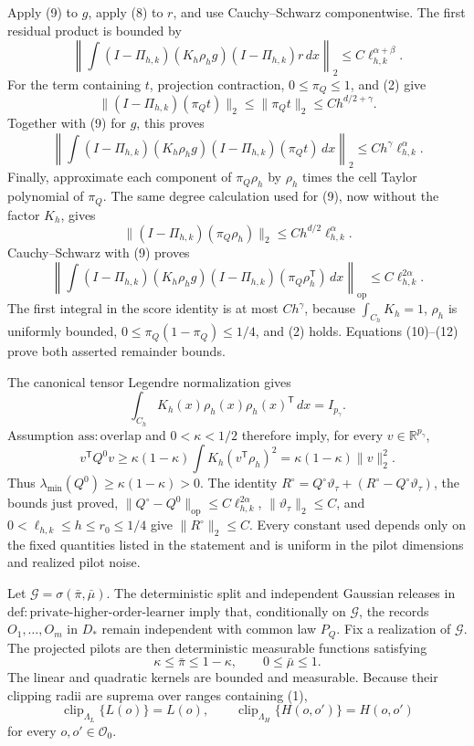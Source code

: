 Apply (9) to \(g\), apply (8) to \(r\), and use Cauchy--Schwarz componentwise.  The first residual product is bounded by
\[
 \left\lVert\int (I-\Pi_{h,k})(K_h\rho_hg)
                  (I-\Pi_{h,k})r\,dx\right\rVert_2
 \le C\ell_{h,k}^{\alpha+\beta}.
\tag{10}
\]
For the term containing \(t\), projection contraction, \(0\le\pi_Q\le1\), and (2) give
\[
 \lVert(I-\Pi_{h,k})(\pi_Qt)\rVert_2
 \le\lVert\pi_Qt\rVert_2\le Ch^{d/2+\gamma}.
\]
Together with (9) for \(g\), this proves
\[
 \left\lVert\int (I-\Pi_{h,k})(K_h\rho_hg)
                  (I-\Pi_{h,k})(\pi_Qt)\,dx\right\rVert_2
 \le Ch^\gamma\ell_{h,k}^\alpha.
\tag{11}
\]
Finally, approximate each component of \(\pi_Q\rho_h\) by \(\rho_h\) times the cell Taylor polynomial of \(\pi_Q\).  The same degree calculation used for (9), now without the factor \(K_h\), gives
\[
 \lVert(I-\Pi_{h,k})(\pi_Q\rho_h)\rVert_2
 \le Ch^{d/2}\ell_{h,k}^\alpha.
\]
Cauchy--Schwarz with (9) proves
\[
 \left\lVert\int (I-\Pi_{h,k})(K_h\rho_hg)
                  (I-\Pi_{h,k})(\pi_Q\rho_h^{\mathsf T})\,dx
 \right\rVert_{\mathrm{op}}
 \le C\ell_{h,k}^{2\alpha}.
\tag{12}
\]
The first integral in the score identity is at most \(Ch^\gamma\), because \(\int_{C_h}K_h=1\), \(\rho_h\) is uniformly bounded, \(0\le\pi_Q(1-\pi_Q)\le1/4\), and (2) holds.  Equations (10)--(12) prove both asserted remainder bounds.

The canonical tensor Legendre normalization gives
\[
 \int_{C_h}K_h(x)\rho_h(x)\rho_h(x)^{\mathsf T}\,dx=I_{p_\gamma}.
\]
Assumption \(\mathrm{ass{:}overlap}\) and \(0<\kappa<1/2\) therefore imply, for every \(v\in\mathbb R^{p_\gamma}\),
\[
 v^{\mathsf T}Q^0v
 \ge\kappa(1-\kappa)\int K_h(v^{\mathsf T}\rho_h)^2
 =\kappa(1-\kappa)\lVert v\rVert_2^2.
\]
Thus \(\lambda_{\min}(Q^0)\ge\kappa(1-\kappa)>0\).  The identity
\(R^\circ=Q^\circ\vartheta_\tau+(R^\circ-Q^\circ\vartheta_\tau)\), the bounds just proved, \(\lVert Q^\circ-Q^0\rVert_{\mathrm{op}}\le C\ell_{h,k}^{2\alpha}\), \(\lVert\vartheta_\tau\rVert_2\le C\), and \(0<\ell_{h,k}\le h\le r_0\le1/4\) give \(\lVert R^\circ\rVert_2\le C\).  Every constant used depends only on the fixed quantities listed in the statement and is uniform in the pilot dimensions and realized pilot noise.

Let \(\mathcal G=\sigma(\bar\pi,\bar\mu)\).  The deterministic split and independent Gaussian releases in \(\mathrm{def{:}private\text{-}higher\text{-}order\text{-}learner}\) imply that, conditionally on \(\mathcal G\), the records \(O_1,\ldots,O_m\) in \(D_*\) remain independent with common law \(P_Q\).  Fix a realization of \(\mathcal G\).  The projected pilots are then deterministic measurable functions satisfying
\[
 \kappa\leq \bar\pi\leq1-\kappa,
 \qquad 0\leq\bar\mu\leq1.
\tag{1}
\]
The linear and quadratic kernels are bounded and measurable.  Because their clipping radii are suprema over ranges containing (1),
\[
 \operatorname{clip}_{\Lambda_L}\{L(o)\}=L(o),
 \qquad
 \operatorname{clip}_{\Lambda_H}\{H(o,o')\}=H(o,o')
\tag{2}
\]
for every \(o,o'\in\mathcal O_0\).

